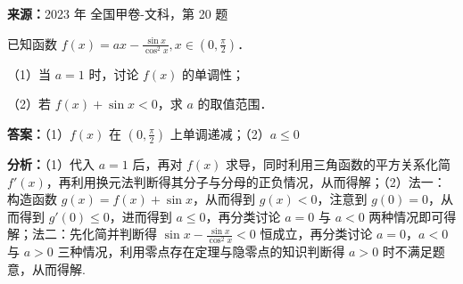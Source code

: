 \begin{question}
\textbf{来源：}2023 年 全国甲卷-文科，第 20 题\par
已知函数 $f(x)=ax-\frac{\sin x}{\cos^2 x}, x\in(0,\frac{\pi}{2})$．

（1）当 $a=1$ 时，讨论 $f(x)$ 的单调性；

（2）若 $f(x)+\sin x<0$，求 $a$ 的取值范围．
\begin{solution}
\textbf{答案：}（1）$f(x)$ 在 $(0,\frac{\pi}{2})$ 上单调递减；（2）$a\le0$

\textbf{分析：}（1）代入 $a=1$ 后，再对 $f(x)$ 求导，同时利用三角函数的平方关系化简 $f'(x)$，再利用换元法判断得其分子与分母的正负情况，从而得解；（2）法一：构造函数 $g(x)=f(x)+\sin x$，从而得到 $g(x)<0$，注意到 $g(0)=0$，从而得到 $g'(0)\le0$，进而得到 $a\le0$，再分类讨论 $a=0$ 与 $a<0$ 两种情况即可得解；法二：先化简并判断得 $\sin x-\frac{\sin x}{\cos^2 x}<0$ 恒成立，再分类讨论 $a=0$，$a<0$ 与 $a>0$ 三种情况，利用零点存在定理与隐零点的知识判断得 $a>0$ 时不满足题意，从而得解.


\end{solution}
\end{question}
